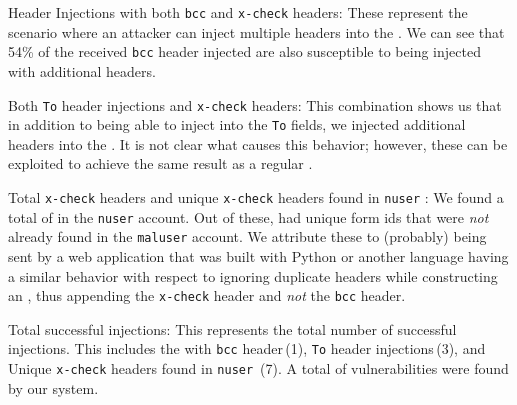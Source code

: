 \Email Header Injections with both \texttt{bcc} and \texttt{x-check}
headers: These represent the scenario where an attacker can inject
multiple headers into the \emails. We can see that 54\% of the
received \texttt{bcc} header injected \emails are also susceptible to
being injected with additional headers.
	
Both \texttt{To} header injections and \texttt{x-check} headers: This
combination shows us that in addition to being able to inject into the
\texttt{To} fields, we injected additional headers into the \email. It
is not clear what causes this behavior; however, these can be
exploited to achieve the same result as a regular \ehi.
	
Total \texttt{x-check} headers and unique \texttt{x-check} headers
found in \texttt{nuser} \emails: We found a total of \ehinuserxcheck
\emails in the \texttt{nuser} account. Out of these,
\ehiuniquenuserxcheck had unique form ids that were \emph{not} already
found in the \texttt{maluser} account. We attribute these \emails to
(probably) being sent by a web application that was built with Python
or another language having a similar behavior with respect to ignoring
duplicate headers while constructing an \email, thus appending the
\texttt{x-check} header and \emph{not} the \texttt{bcc} header.
	
Total successful injections: This represents the total number of
successful injections. This includes the \ehi with \texttt{bcc}
header\,(1), \texttt{To} header injections\,(3), and Unique
\texttt{x-check} headers found in \texttt{nuser} \emails\,(7). A total
of \success vulnerabilities were found by our system.

